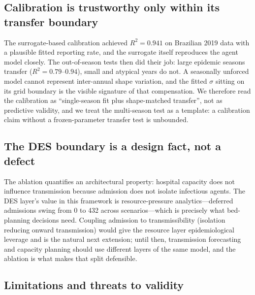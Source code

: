 \documentclass[]{interact}
\begin{document}
\subsection{Calibration is trustworthy only within its transfer boundary}

The surrogate-based calibration achieved $R^{2}=0.941$ on Brazilian 2019 data with a plausible fitted reporting rate, and the surrogate itself reproduces the agent model closely. The out-of-season tests then did their job: large epidemic seasons transfer ($R^{2}=0.79$--$0.94$), small and atypical years do not. A seasonally unforced model cannot represent inter-annual shape variation, and the fitted $\sigma$ sitting on its grid boundary is the visible signature of that compensation. We therefore read the calibration as ``single-season fit plus shape-matched transfer'', not as predictive validity, and we treat the multi-season test as a template: a calibration claim without a frozen-parameter transfer test is unbounded.

\subsection{The DES boundary is a design fact, not a defect}

The ablation quantifies an architectural property: hospital capacity does not influence transmission because admission does not isolate infectious agents. The DES layer's value in this framework is resource-pressure analytics---deferred admissions swing from 0 to 432 across scenarios---which is precisely what bed-planning decisions need. Coupling admission to transmissibility (isolation reducing onward transmission) would give the resource layer epidemiological leverage and is the natural next extension; until then, transmission forecasting and capacity planning should use different layers of the same model, and the ablation is what makes that split defensible.

\subsection{Limitations and threats to validity}
\end{document}
